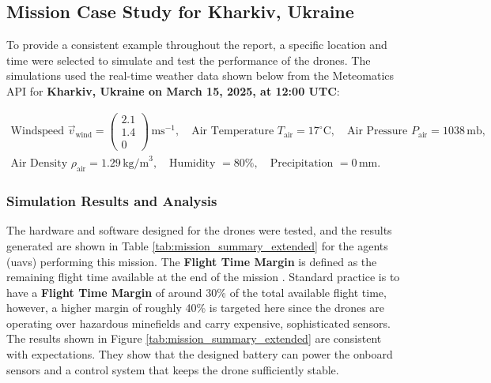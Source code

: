 \subsection{Mission Case Study for Kharkiv, Ukraine}
\label{mocs}

To provide a consistent example throughout the report, a specific location and time were selected to simulate and test the performance of the drones. The simulations used the real-time weather data shown below from the Meteomatics API for \textbf{Kharkiv, Ukraine on March 15, 2025, at 12:00 UTC}: \vspace{-3em}

\begin{gather*}
\text{Windspeed } \vec{v}_{\text{wind}} = \begin{pmatrix}2.1 \\ 1.4 \\ 0\end{pmatrix}\,\text{ms}^{-1},\quad 
\text{Air Temperature } T_{\text{air}} = 17^\circ\text{C},\quad 
\text{Air Pressure } P_{\text{air}} = 1038\,\text{mb}, \\
\text{Air Density } \rho_{\text{air}} = 1.29\,\text{kg/m}^3,\quad 
\text{Humidity } = 80\%,\quad 
\text{Precipitation } = 0\,\text{mm}.
\end{gather*}

\subsubsection{Simulation Results and Analysis}
\label{simdata}

The hardware and software designed for the drones were tested, and the results generated are shown in Table \ref{tab:mission_summary_extended} for the agents (\gls{uav}s) performing this mission. The \textbf{Flight Time Margin} is defined as the remaining flight time available at the end of the mission \cite{technologies11010012}. Standard practice is to have a \textbf{Flight Time Margin} of around 30\% of the total available flight time, however, a higher margin of roughly 40\% is targeted here since the drones are operating over hazardous minefields and carry expensive, sophisticated sensors. The results shown in Figure \ref{tab:mission_summary_extended} are consistent with expectations. They show that the designed battery can power the onboard sensors and a control system that keeps the drone sufficiently stable.

